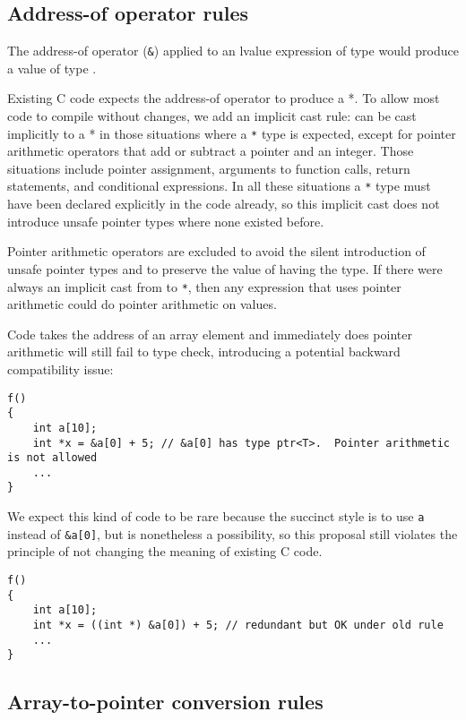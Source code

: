 \subsection{Address-of operator rules}

The address-of operator (\texttt{\&}) applied to an lvalue expression of
type  would produce a value of type
\ptrT.

Existing C code expects the address-of operator to produce a  *.
To allow most code to compile without changes, we add an implicit cast
rule: \ptrT can be cast
implicitly to a  * in those situations where a 
\texttt{*} type is expected, except for pointer arithmetic operators
that add or subtract a pointer and an integer. Those situations include
pointer assignment, arguments to function calls, return statements, and
conditional expressions. In all these situations a  \texttt{*}
type must have been declared explicitly in the code already, so this
implicit cast does not introduce unsafe pointer types where none existed
before.

Pointer arithmetic operators are excluded to avoid the silent
introduction of unsafe pointer types and to preserve the value of having
the \ptrT type. If
there were always an implicit cast from \ptrT to  \texttt{*},
then any expression that uses pointer arithmetic could do pointer
arithmetic on \ptrT
values.

Code takes the address of an array element and immediately does pointer
arithmetic will still fail to type check, introducing a potential
backward compatibility issue:
\begin{verbatim}
f()
{
    int a[10];
    int *x = &a[0] + 5; // &a[0] has type ptr<T>.  Pointer arithmetic is not allowed
    ...
}
\end{verbatim}

We expect this kind of code to be rare because the succinct style is to
use \texttt{a} instead of \texttt{\&a[0]}, but is nonetheless a
possibility, so this proposal still violates the principle of not
changing the meaning of existing C code.

\begin{verbatim}
f()
{
    int a[10];
    int *x = ((int *) &a[0]) + 5; // redundant but OK under old rule
    ...
}
\end{verbatim}

\subsection{Array-to-pointer conversion rules}

